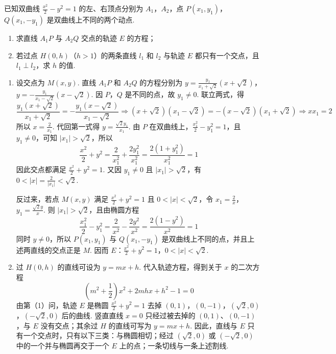 \begin{problem}
已知双曲线 \(\frac{x^2}{2} - y^2 = 1\) 的左、右顶点分别为 \(A_1\)，\(A_2\)，点 \(P(x_1, y_1)\)，\(Q(x_1, -y_1)\) 是双曲线上不同的两个动点.

\begin{enumerate}
\item 求直线 \(A_{1}P\) 与 \(A_{2}Q\) 交点的轨迹 \(E\) 的方程；
\item 若过点 \(H(0, h)\)（\(h > 1\)）的两条直线 \(l_{1}\) 和 \(l_{2}\) 与轨迹 \(E\) 都只有一个交点，且 \(l_{1} \perp l_{2}\)，求 \(h\) 的值.
\end{enumerate}
\end{problem}

\begin{solution}
\begin{enumerate}
\item 设交点为 \(M(x,y)\). 直线 \(A_1P\) 和 \(A_2Q\) 的方程分别为
\(y=\frac{y_1}{x_1+\sqrt2}(x+\sqrt2)\)，\(y=-\frac{y_1}{x_1-\sqrt2}(x-\sqrt2)\).
因 \(P\)，\(Q\) 是不同的点，故 \(y_1\ne0\). 联立两式，得
\[
\frac{y_1(x+\sqrt2)}{x_1+\sqrt2}=-\frac{y_1(x-\sqrt2)}{x_1-\sqrt2}
\Longrightarrow (x+\sqrt2)(x_1-\sqrt2)=-(x-\sqrt2)(x_1+\sqrt2)
\Longrightarrow xx_1=2
\]
所以 \(x=\frac2{x_1}\). 代回第一式得 \(y=\frac{\sqrt2y_1}{x_1}\). 由 \(P\) 在双曲线上，\(\frac{x_1^2}{2}-y_1^2=1\)，且 \(y_1\ne0\)，可知 \(\lvert x_1\rvert>\sqrt2\)，所以
\[
\frac{x^2}{2}+y^2=\frac2{x_1^2}+\frac{2y_1^2}{x_1^2}=\frac{2(1+y_1^2)}{x_1^2}=1
\]
因此交点都满足 \(\frac{x^2}{2}+y^2=1\). 又因 \(y_1\ne0\) 且 \(\lvert x_1\rvert>\sqrt2\)，有 \(0<\lvert x\rvert=\frac2{\lvert x_1\rvert}<\sqrt2\).

反过来，若点 \(M(x,y)\) 满足 \(\frac{x^2}{2}+y^2=1\) 且 \(0<\lvert x\rvert<\sqrt2\)，令
\(x_1=\frac2x\)，\(y_1=\frac{\sqrt2y}{x}\).
则 \(\lvert x_1\rvert>\sqrt2\)，且由椭圆方程
\[
\frac{x_1^2}{2}-y_1^2=\frac2{x^2}-\frac{2y^2}{x^2}=\frac{2(1-y^2)}{x^2}=1
\]
同时 \(y\ne0\)，所以 \(P(x_1,y_1)\) 与 \(Q(x_1,-y_1)\) 是双曲线上不同的点，并且上述两直线的交点正是 \(M\). 因而
\(E\)：\(\frac{x^2}{2}+y^2=1\)，\(0<\lvert x\rvert<\sqrt2\).
\item 过 \(H(0,h)\) 的直线可设为 \(y=mx+h\). 代入轨迹方程，得到关于 \(x\) 的二次方程
\[
\left(m^2+\frac12\right)x^2+2mhx+h^2-1=0
\]
由第（1）问，轨迹 \(E\) 是椭圆 \(\frac{x^2}{2}+y^2=1\) 去掉 \((0,1)\)，\((0,-1)\)，\((\sqrt2,0)\)，\((-\sqrt2,0)\) 后的曲线. 竖直直线 \(x=0\) 只经过被去掉的 \((0,1)\)、\((0,-1)\)，与 \(E\) 没有交点；其余过 \(H\) 的直线可写为 \(y=mx+h\). 因此，直线与 \(E\) 只有一个交点时，只有以下三类：与椭圆相切；经过 \((\sqrt2,0)\) 或 \((-\sqrt2,0)\) 中的一个并与椭圆再交于一个 \(E\) 上的点；一条切线与一条上述割线.


\end{enumerate}
\end{solution}
